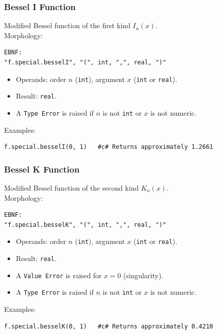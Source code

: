 \subsubsection{Bessel I Function}
Modified Bessel function of the first kind $I_n(x)$. \\
Morphology:
\begin{verbatim}
EBNF:
"f.special.besselI", "(", int, ",", real, ")"
\end{verbatim}
\begin{itemize}
\item Operands: order $n$ (\texttt{int}), argument $x$ (\texttt{int} or \texttt{real}).
\item Result: \texttt{real}.
\item A \texttt{Type Error} is raised if $n$ is not \texttt{int} or $x$ is not numeric.
\end{itemize}
Examples:
\begin{verbatim}
f.special.besselI(0, 1)   #c# Returns approximately 1.2661
\end{verbatim}

\subsubsection{Bessel K Function}
Modified Bessel function of the second kind $K_n(x)$. \\
Morphology:
\begin{verbatim}
EBNF:
"f.special.besselK", "(", int, ",", real, ")"
\end{verbatim}
\begin{itemize}
\item Operands: order $n$ (\texttt{int}), argument $x$ (\texttt{int} or \texttt{real}).
\item Result: \texttt{real}.
\item A \texttt{Value Error} is raised for $x = 0$ (singularity).
\item A \texttt{Type Error} is raised if $n$ is not \texttt{int} or $x$ is not numeric.
\end{itemize}
Examples:
\begin{verbatim}
f.special.besselK(0, 1)   #c# Returns approximately 0.4210
\end{verbatim}

